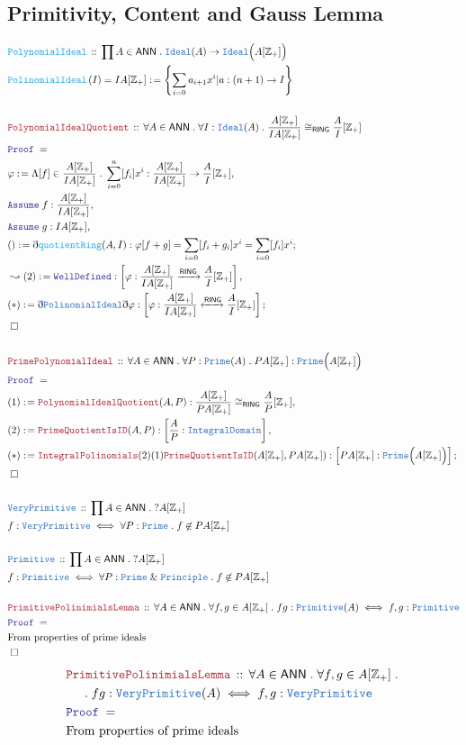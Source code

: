 \documentclass[12pt]{scrartcl}
\newcommand{\TYPE}[1]{\textcolor{NavyBlue}{\mathtt{#1}}}
\newcommand{\FUNC}[1]{\textcolor{Cerulean}{\mathtt{#1}}}
\newcommand{\LOGIC}[1]{\textcolor{Blue}{\mathtt{#1}}}
\newcommand{\THM}[1]{\textcolor{Maroon}{\mathtt{#1}}}
\renewcommand{\.}{\; . \;}
\newcommand{\de}{: \kern 0.1pc =}
\newcommand{\Act}[1]{\left( #1 \right)}
\newcommand{\Theorem}[2]{& \THM{#1} \, :: \, #2 \\ & \Proof = \\ }
\newcommand{\DeclareType}[2]{& \TYPE{#1} \, :: \, #2 \\}
\newcommand{\DefineType}[3]{& #1 : \TYPE{#2} \iff #3 \\}
\newcommand{\DeclareFunc}[2]{& \FUNC{#1} \, :: \, #2 \\}
\newcommand{\DefineNamedFunc}[4]{&  \FUNC{#1}\Act{#2} = #3 \de #4 \\}
\newcommand{\NewLine}{\\ & \kern 1pc}
\newcommand{\Page}[1]{ \begin{align*} #1 \end{align*}   }
\newcommand{ \bd }{ \ByDef }
\renewcommand{\And}{\; \& \;}
\newcommand{\Int}{\mathbb{Z} }
\newcommand{\Say}[3]{& #1 \de #2 : #3, \\}
\newcommand{\Conclude}[3]{& #1 \de #2 : #3; \\}
\newcommand{\Derive}[3]{& \leadsto #1 \de #2 : #3, \\}
\newcommand{\Assume}[2]{& \LOGIC{Assume} \; #1 : #2, \\}
\newcommand{\QED}{\; \square}
\newcommand{\EndProof}{& \QED \\}
\newcommand{\ByDef}{\eth}
\newcommand{\Proof}{\LOGIC{Proof} \; }
\newcommand{\Arrow}[1]{\xrightarrow{#1}}
\newcommand{\ToIso}[1]{\xleftrightarrow{#1}}
\newcommand{\Ideal}{\TYPE{Ideal}}
\newcommand{\ID}{\TYPE{IntegralDomain}}
\newcommand{\RING}{\mathsf{RING}}
\newcommand{\ANN}{\mathsf{ANN}}
\begin{document}
\subsection{Primitivity, Content and Gauss Lemma}
\Page{
	\DeclareFunc{PolynomialIdeal}{\prod A \in \ANN \.  \Ideal(A) \to \Ideal\Big(A[\Int_+]\Big)}
	\DefineNamedFunc{PolinomialIdeal}{I}{IA[\Int_+]}{\left\{ \sum_{i=0} a_{i+1} x^i  | a : (n+1) \to I   \right\}}
	\\
	\Theorem{PolynomialIdealQuotient}{\forall A \in \ANN \. \forall I : \Ideal(A) \. \frac{A[\Int_+]}{IA[\Int_+]} \cong_{\RING} \frac{A}{I}[\Int_+]}
	\Say{\varphi}{\Lambda [f] \in \frac{A[\Int_+]}{IA[\Int_+]} \. \sum^n_{i=0} [f_i] x^i}{ \frac{A[\Int_+]}{IA[\Int_+]} \to \frac{A}{I}[\Int_+]}
	\Assume{f}{\frac{A[\Int_+]}{IA[\Int_+]}}
	\Assume{g}{IA[\Int_+]}
	\Conclude{()}{ \bd \FUNC{quotientRing}(A,I) }{\varphi[f+g] = \sum_{i=0} [f_i + g_i]x^i = \sum_{i=0} [f_i]x^i }
	\Derive{(2)}{\LOGIC{WellDefined}}{ \left[\varphi : \frac{A[\Int_+]}{IA[\Int_+]} \Arrow{\RING} \frac{A}{I}[\Int_+] \right]  }  
	\Conclude{(*)}{\bd \TYPE{PolinomialIdeal}\bd \varphi}{ \left[ \varphi : \frac{A[\Int_+]}{IA[\Int_+]} \ToIso{\RING} \frac{A}{I}[\Int_+] \right]   }
	\EndProof
	\\
	\Theorem{PrimePolynomialIdeal}{ \forall A \in \ANN \. \forall P : \TYPE{Prime}(A) \.  PA[\Int_+] : \TYPE{Prime}\Big(A[\Int_+]\Big)}
	\Say{(1)}{\THM{PolynomialIdealQuotient}(A,P)}{\frac{A[\Int_+]}{PA[\Int_+]} \cong_{\RING} \frac{A}{P}[\Int_+]}
	\Say{(2)}{\THM{PrimeQuotientIsID}(A,P)}{\left[ \frac{A}{P} : \ID \right]}
	\Conclude{(*)}{\THM{IntegralPolinomials}(2)(1)\THM{PrimeQuotientIsID}(A[\Int_+],PA[\Int_+])  }{\left[  PA[\Int_+] : \TYPE{Prime}\Big(A[\Int_+]\Big) \right]}
	\EndProof
	\\
	\DeclareType{VeryPrimitive}{\prod A \in \ANN \. ?A[\Int_+]}
	\DefineType{f}{VeryPrimitive}{\forall P : \TYPE{Prime} \. f \not \in PA[\Int_+]}
	\\
	\DeclareType{Primitive}{\prod A \in \ANN \. ?A[\Int_+]}
	\DefineType{f}{Primitive}{\forall P : \TYPE{Prime} \And \TYPE{Principle} \. f \not \in PA[\Int_+] }
	\\
	\Theorem{PrimitivePolinimialsLemma}{ \forall A \in \ANN \. \forall f,g \in A[\Int_+] \. fg : \TYPE{Primitive}(A) \iff f,g : \TYPE{Primitive}  }
	&\text{From properties of prime ideals}\\
	\EndProof
}\Page{
	\Theorem{PrimitivePolinimialsLemma}{ \forall A \in \ANN \. \forall f,g \in A[\Int_+] \.  \NewLine \. fg : \TYPE{VeryPrimitive}(A) \iff f,g : \TYPE{VeryPrimitive}  }
	&\text{From properties of prime ideals}\\
}
\end{document}
